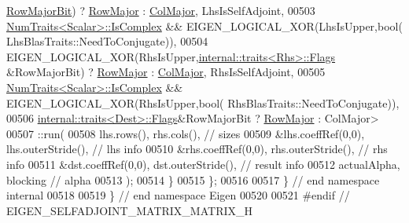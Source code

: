 \begin{DoxyCode}
      \hyperlink{group__flags_gae4f56c2a60bbe4bd2e44c5b19cbe8762}{RowMajorBit}) ? \hyperlink{group__enums_ggaacded1a18ae58b0f554751f6cdf9eb13acfcde9cd8677c5f7caf6bd603666aae3}{RowMajor} : \hyperlink{group__enums_ggaacded1a18ae58b0f554751f6cdf9eb13a0cbd4bdd0abcfc0224c5fcb5e4f6669a}{ColMajor}, LhsIsSelfAdjoint,
00503       \hyperlink{group___core___module_struct_eigen_1_1_num_traits}{NumTraits<Scalar>::IsComplex} && EIGEN\_LOGICAL\_XOR(LhsIsUpper,\textcolor{keywordtype}{bool}(
      LhsBlasTraits::NeedToConjugate)),
00504       EIGEN\_LOGICAL\_XOR(RhsIsUpper,\hyperlink{struct_eigen_1_1internal_1_1traits}{internal::traits<Rhs>::Flags} &RowMajorBit) ?
       \hyperlink{group__enums_ggaacded1a18ae58b0f554751f6cdf9eb13acfcde9cd8677c5f7caf6bd603666aae3}{RowMajor} : \hyperlink{group__enums_ggaacded1a18ae58b0f554751f6cdf9eb13a0cbd4bdd0abcfc0224c5fcb5e4f6669a}{ColMajor}, RhsIsSelfAdjoint,
00505       \hyperlink{group___core___module_struct_eigen_1_1_num_traits}{NumTraits<Scalar>::IsComplex} && EIGEN\_LOGICAL\_XOR(RhsIsUpper,\textcolor{keywordtype}{bool}(
      RhsBlasTraits::NeedToConjugate)),
00506       \hyperlink{struct_eigen_1_1internal_1_1traits}{internal::traits<Dest>::Flags}&RowMajorBit  ? 
      \hyperlink{group__enums_ggaacded1a18ae58b0f554751f6cdf9eb13acfcde9cd8677c5f7caf6bd603666aae3}{RowMajor} : ColMajor>
00507       ::run(
00508         lhs.rows(), rhs.cols(),                 \textcolor{comment}{// sizes}
00509         &lhs.coeffRef(0,0), lhs.outerStride(),  \textcolor{comment}{// lhs info}
00510         &rhs.coeffRef(0,0), rhs.outerStride(),  \textcolor{comment}{// rhs info}
00511         &dst.coeffRef(0,0), dst.outerStride(),  \textcolor{comment}{// result info}
00512         actualAlpha, blocking                   \textcolor{comment}{// alpha}
00513       );
00514   \}
00515 \};
00516 
00517 \} \textcolor{comment}{// end namespace internal}
00518 
00519 \} \textcolor{comment}{// end namespace Eigen}
00520 
00521 \textcolor{preprocessor}{#endif // EIGEN\_SELFADJOINT\_MATRIX\_MATRIX\_H}
\end{DoxyCode}
